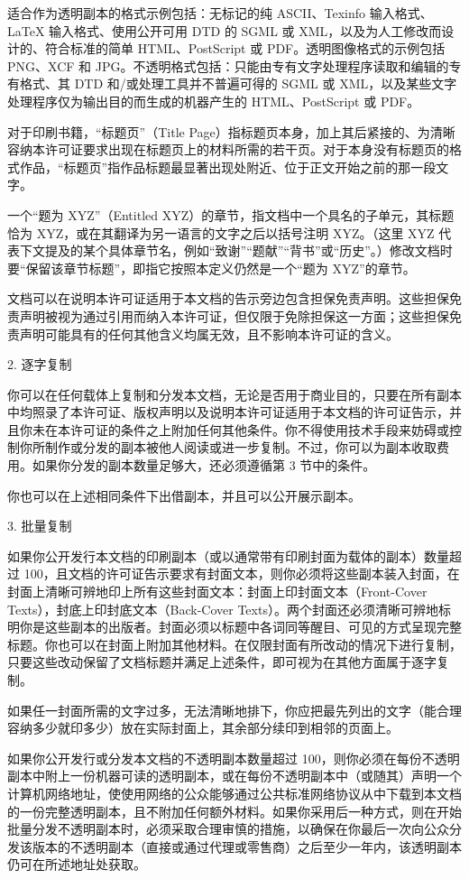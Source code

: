 \documentclass[a4paper]{rapport3}
\begin{document}
适合作为透明副本的格式示例包括：无标记的纯 ASCII、Texinfo 输入格式、LaTeX 输入格式、使用公开可用 DTD 的 SGML 或 XML，以及为人工修改而设计的、符合标准的简单 HTML、PostScript 或 PDF。透明图像格式的示例包括 PNG、XCF 和 JPG。不透明格式包括：只能由专有文字处理程序读取和编辑的专有格式、其 DTD 和/或处理工具并不普遍可得的 SGML 或 XML，以及某些文字处理程序仅为输出目的而生成的机器产生的 HTML、PostScript 或 PDF。

对于印刷书籍，“标题页”（Title Page）指标题页本身，加上其后紧接的、为清晰容纳本许可证要求出现在标题页上的材料所需的若干页。对于本身没有标题页的格式作品，“标题页”指作品标题最显著出现处附近、位于正文开始之前的那一段文字。

一个“题为 XYZ”（Entitled XYZ）的章节，指文档中一个具名的子单元，其标题恰为 XYZ，或在其翻译为另一语言的文字之后以括号注明 XYZ。（这里 XYZ 代表下文提及的某个具体章节名，例如“致谢”“题献”“背书”或“历史”。）修改文档时要“保留该章节标题”，即指它按照本定义仍然是一个“题为 XYZ”的章节。

文档可以在说明本许可证适用于本文档的告示旁边包含担保免责声明。这些担保免责声明被视为通过引用而纳入本许可证，但仅限于免除担保这一方面；这些担保免责声明可能具有的任何其他含义均属无效，且不影响本许可证的含义。

2. 逐字复制

你可以在任何载体上复制和分发本文档，无论是否用于商业目的，只要在所有副本中均照录了本许可证、版权声明以及说明本许可证适用于本文档的许可证告示，并且你未在本许可证的条件之上附加任何其他条件。你不得使用技术手段来妨碍或控制你所制作或分发的副本被他人阅读或进一步复制。不过，你可以为副本收取费用。如果你分发的副本数量足够大，还必须遵循第 3 节中的条件。

你也可以在上述相同条件下出借副本，并且可以公开展示副本。

3. 批量复制

如果你公开发行本文档的印刷副本（或以通常带有印刷封面为载体的副本）数量超过 100，且文档的许可证告示要求有封面文本，则你必须将这些副本装入封面，在封面上清晰可辨地印上所有这些封面文本：封面上印封面文本（Front-Cover Texts），封底上印封底文本（Back-Cover Texts）。两个封面还必须清晰可辨地标明你是这些副本的出版者。封面必须以标题中各词同等醒目、可见的方式呈现完整标题。你也可以在封面上附加其他材料。在仅限封面有所改动的情况下进行复制，只要这些改动保留了文档标题并满足上述条件，即可视为在其他方面属于逐字复制。

如果任一封面所需的文字过多，无法清晰地排下，你应把最先列出的文字（能合理容纳多少就印多少）放在实际封面上，其余部分续印到相邻的页面上。

如果你公开发行或分发本文档的不透明副本数量超过 100，则你必须在每份不透明副本中附上一份机器可读的透明副本，或在每份不透明副本中（或随其）声明一个计算机网络地址，使使用网络的公众能够通过公共标准网络协议从中下载到本文档的一份完整透明副本，且不附加任何额外材料。如果你采用后一种方式，则在开始批量分发不透明副本时，必须采取合理审慎的措施，以确保在你最后一次向公众分发该版本的不透明副本（直接或通过代理或零售商）之后至少一年内，该透明副本仍可在所述地址处获取。
\end{document}
